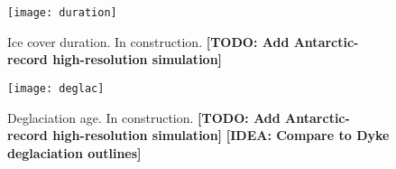 \documentclass[tc, ms]{copernicus}
\def\idea#1{\textcolor[rgb]{0,0.5,0}{\textbf{[IDEA: #1]}}}
\def\todo#1{\textcolor[rgb]{0.5,0,0}{\textbf{[TODO: #1]}}}
\begin{document}
\begin{figure}
  \texttt{[image: duration]}
  \caption{Ice cover duration. In construction.
           \todo{Add Antarctic-record high-resolution simulation}}
  \label{fig:duration}
\end{figure}

\begin{figure}
  \texttt{[image: deglac]}
  \caption{Deglaciation age. In construction.
           \todo{Add Antarctic-record high-resolution simulation}
           \idea{Compare to Dyke deglaciation outlines}}
  \label{fig:deglac}
\end{figure}

\end{document}
